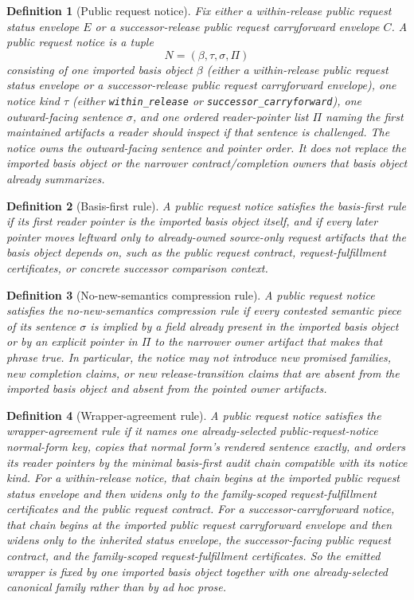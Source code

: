 \documentclass[11pt]{article}
\newtheorem{definition}{Definition}
\begin{document}
\begin{definition}[Public request notice]
Fix either a within-release public request status envelope $E$ or a successor-release public request carryforward envelope $C$.
A \emph{public request notice} is a tuple
\[
N=(\beta,\tau,\sigma,\Pi)
\]
consisting of one imported basis object $\beta$ (either a within-release public request status envelope or a successor-release public request carryforward envelope), one notice kind $\tau$ (either \texttt{within\_release} or \texttt{successor\_carryforward}), one outward-facing sentence $\sigma$, and one ordered reader-pointer list $\Pi$ naming the first maintained artifacts a reader should inspect if that sentence is challenged.
The notice owns the outward-facing sentence and pointer order.
It does not replace the imported basis object or the narrower contract/completion owners that basis object already summarizes.
\end{definition}

\begin{definition}[Basis-first rule]
A public request notice satisfies the \emph{basis-first rule} if its first reader pointer is the imported basis object itself, and if every later pointer moves leftward only to already-owned source-only request artifacts that the basis object depends on, such as the public request contract, request-fulfillment certificates, or concrete successor comparison context.
\end{definition}

\begin{definition}[No-new-semantics compression rule]
A public request notice satisfies the \emph{no-new-semantics compression rule} if every contested semantic piece of its sentence $\sigma$ is implied by a field already present in the imported basis object or by an explicit pointer in $\Pi$ to the narrower owner artifact that makes that phrase true.
In particular, the notice may not introduce new promised families, new completion claims, or new release-transition claims that are absent from the imported basis object and absent from the pointed owner artifacts.
\end{definition}

\begin{definition}[Wrapper-agreement rule]
A public request notice satisfies the \emph{wrapper-agreement rule} if it names one already-selected public-request-notice normal-form key, copies that normal form's rendered sentence exactly, and orders its reader pointers by the minimal basis-first audit chain compatible with its notice kind.
For a within-release notice, that chain begins at the imported public request status envelope and then widens only to the family-scoped request-fulfillment certificates and the public request contract.
For a successor-carryforward notice, that chain begins at the imported public request carryforward envelope and then widens only to the inherited status envelope, the successor-facing public request contract, and the family-scoped request-fulfillment certificates.
So the emitted wrapper is fixed by one imported basis object together with one already-selected canonical family rather than by ad hoc prose.
\end{definition}
\end{document}
